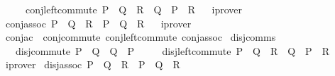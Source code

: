 \begin{isabellebody}
\ \ \ \ \ conj{\isacharunderscore}{\kern0pt}left{\isacharunderscore}{\kern0pt}commute{\isacharcolon}{\kern0pt}\ {\isachardoublequoteopen}P\ {\isasymand}\ {\isacharparenleft}{\kern0pt}Q\ {\isasymand}\ R{\isacharparenright}{\kern0pt}\ {\isasymlongleftrightarrow}\ Q\ {\isasymand}\ {\isacharparenleft}{\kern0pt}P\ {\isasymand}\ R{\isacharparenright}{\kern0pt}{\isachardoublequoteclose}%
\isadelimproof
\ %
\endisadelimproof
%
\isatagproof
{}\isamarkupfalse%
\ iprover{\isacharplus}{\kern0pt}%
\endisatagproof
{\isafoldproof}%
%
\isadelimproof
%
\endisadelimproof
\isanewline
{}\isamarkupfalse%
\ conj{\isacharunderscore}{\kern0pt}assoc{\isacharcolon}{\kern0pt}\ {\isachardoublequoteopen}{\isacharparenleft}{\kern0pt}P\ {\isasymand}\ Q{\isacharparenright}{\kern0pt}\ {\isasymand}\ R\ {\isasymlongleftrightarrow}\ P\ {\isasymand}\ {\isacharparenleft}{\kern0pt}Q\ {\isasymand}\ R{\isacharparenright}{\kern0pt}{\isachardoublequoteclose}%
\isadelimproof
\ %
\endisadelimproof
%
\isatagproof
{}\isamarkupfalse%
\ iprover%
\endisatagproof
{\isafoldproof}%
%
\isadelimproof
%
\endisadelimproof
\isanewline
\isanewline
{}\isamarkupfalse%
\ conj{\isacharunderscore}{\kern0pt}ac\ {\isacharequal}{\kern0pt}\ conj{\isacharunderscore}{\kern0pt}commute\ conj{\isacharunderscore}{\kern0pt}left{\isacharunderscore}{\kern0pt}commute\ conj{\isacharunderscore}{\kern0pt}assoc\isanewline
\isanewline
{}\isamarkupfalse%
\ disj{\isacharunderscore}{\kern0pt}comms{\isacharcolon}{\kern0pt}\isanewline
\ \ \ disj{\isacharunderscore}{\kern0pt}commute{\isacharcolon}{\kern0pt}\ {\isachardoublequoteopen}P\ {\isasymor}\ Q\ {\isasymlongleftrightarrow}\ Q\ {\isasymor}\ P{\isachardoublequoteclose}\isanewline
\ \ \ \ \ disj{\isacharunderscore}{\kern0pt}left{\isacharunderscore}{\kern0pt}commute{\isacharcolon}{\kern0pt}\ {\isachardoublequoteopen}P\ {\isasymor}\ {\isacharparenleft}{\kern0pt}Q\ {\isasymor}\ R{\isacharparenright}{\kern0pt}\ {\isasymlongleftrightarrow}\ Q\ {\isasymor}\ {\isacharparenleft}{\kern0pt}P\ {\isasymor}\ R{\isacharparenright}{\kern0pt}{\isachardoublequoteclose}%
\isadelimproof
\ %
\endisadelimproof
%
\isatagproof
{}\isamarkupfalse%
\ iprover{\isacharplus}{\kern0pt}%
\endisatagproof
{\isafoldproof}%
%
\isadelimproof
%
\endisadelimproof
\isanewline
{}\isamarkupfalse%
\ disj{\isacharunderscore}{\kern0pt}assoc{\isacharcolon}{\kern0pt}\ {\isachardoublequoteopen}{\isacharparenleft}{\kern0pt}P\ {\isasymor}\ Q{\isacharparenright}{\kern0pt}\ {\isasymor}\ R\ {\isasymlongleftrightarrow}\ P\ {\isasymor}\ {\isacharparenleft}{\kern0pt}Q\ {\isasymor}\ R{\isacharparenright}{\kern0pt}{\isachardoublequoteclose}%

\end{isabellebody}
